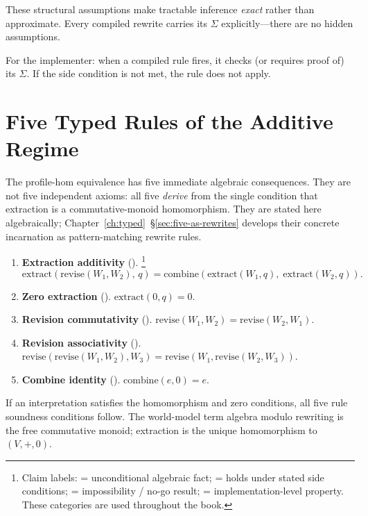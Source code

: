 \documentclass[11pt,openany]{report}
\begin{document}
These structural assumptions make tractable inference \emph{exact}
rather than approximate.  Every compiled rewrite carries
its $\Sigma$ explicitly---there are no hidden assumptions.

For the implementer: when a compiled rule fires, it checks (or
requires proof of) its $\Sigma$.  If the side condition is not met,
the rule does not apply.


\section{Five Typed Rules of the Additive Regime}
\label{sec:algebraic-core}

The profile-hom equivalence has five immediate algebraic consequences.
They are not five independent axioms: all five \emph{derive} from the
single condition that extraction is a commutative-monoid homomorphism.
They are stated here algebraically;
Chapter~\ref{ch:typed}~\S\ref{sec:five-as-rewrites} develops their
concrete incarnation as pattern-matching rewrite rules.

\begin{enumerate}
\item \textbf{Extraction additivity} (\claimCore{}).%
  \footnote{Claim labels: \claimCore{} = unconditional algebraic fact;
  \claimConditional{} = holds under stated side conditions;
  \claimBoundary{} = impossibility / no-go result;
  \claimOperational{} = implementation-level property.
  These categories are used throughout the book.}
  \[\mathrm{extract}(\mathrm{revise}(W_1, W_2),\, q)
    = \mathrm{combine}(\mathrm{extract}(W_1, q),\;
                         \mathrm{extract}(W_2, q)).\]

\item \textbf{Zero extraction} (\claimCore{}).
  $\mathrm{extract}(0, q) = 0$.

\item \textbf{Revision commutativity} (\claimCore{}).
  $\mathrm{revise}(W_1, W_2) = \mathrm{revise}(W_2, W_1)$.

\item \textbf{Revision associativity} (\claimCore{}).
  $\mathrm{revise}(\mathrm{revise}(W_1, W_2), W_3)
  = \mathrm{revise}(W_1, \mathrm{revise}(W_2, W_3))$.

\item \textbf{Combine identity} (\claimCore{}).
  $\mathrm{combine}(e, 0) = e$.
\end{enumerate}

\begin{theorem}
\label{thm:algebraic-core}
If an interpretation satisfies the homomorphism and zero conditions, all
five rule soundness conditions follow.  The world-model term algebra
modulo rewriting is the free commutative monoid; extraction is the
unique homomorphism to $(V, +, 0)$.
\end{theorem}
\end{document}
